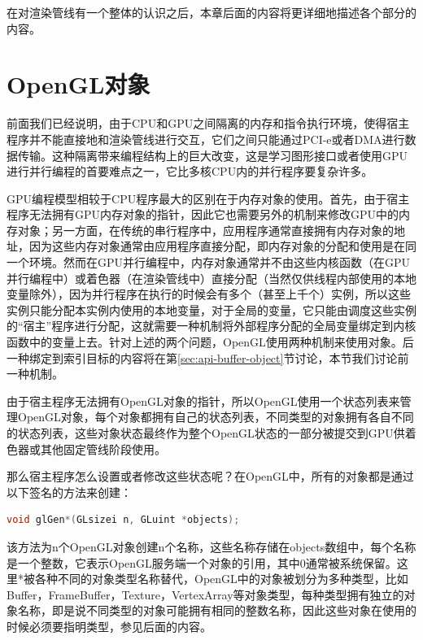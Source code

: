 在对渲染管线有一个整体的认识之后，本章后面的内容将更详细地描述各个部分的内容。





\section{OpenGL对象}\label{sec:api-opengl-object}
前面我们已经说明，由于CPU和GPU之间隔离的内存和指令执行环境，使得宿主程序并不能直接地和渲染管线进行交互，它们之间只能通过PCI-e或者DMA进行数据传输。这种隔离带来编程结构上的巨大改变，这是学习图形接口或者使用GPU进行并行编程的首要难点之一，它比多核CPU内的并行程序要复杂许多。

GPU编程模型相较于CPU程序最大的区别在于内存对象的使用。首先，由于宿主程序无法拥有GPU内存对象的指针，因此它也需要另外的机制来修改GPU中的内存对象；另一方面，在传统的串行程序中，应用程序通常直接拥有内存对象的地址，因为这些内存对象通常由应用程序直接分配，即内存对象的分配和使用是在同一个环境。然而在GPU并行编程中，内存对象通常并不由这些内核函数（在GPU并行编程中）或着色器（在渲染管线中）直接分配（当然仅供线程内部使用的本地变量除外），因为并行程序在执行的时候会有多个（甚至上千个）实例，所以这些实例只能分配本实例内使用的本地变量，对于全局的变量，它只能由调度这些实例的“宿主”程序进行分配，这就需要一种机制将外部程序分配的全局变量绑定到内核函数中的变量上去。针对上述的两个问题，OpenGL使用两种机制来使用对象。后一种绑定到索引目标的内容将在第\ref{sec:api-buffer-object}节讨论，本节我们讨论前一种机制。

由于宿主程序无法拥有OpenGL对象的指针，所以OpenGL使用一个状态列表来管理OpenGL对象，每个对象都拥有自己的状态列表，不同类型的对象拥有各自不同的状态列表，这些对象状态最终作为整个OpenGL状态的一部分被提交到GPU供着色器或其他固定管线阶段使用。

那么宿主程序怎么设置或者修改这些状态呢？在OpenGL中，所有的对象都是通过以下签名的方法来创建：

\begin{lstlisting}[language=C++]
void glGen*(GLsizei n​, GLuint *objects​);
\end{lstlisting}

该方法为n个OpenGL对象创建n个名称，这些名称存储在objects数组中，每个名称是一个整数，它表示OpenGL服务端一个对象的引用，其中0通常被系统保留。这里*被各种不同的对象类型名称替代，OpenGL中的对象被划分为多种类型，比如Buffer，FrameBuffer，Texture，VertexArray等对象类型，每种类型拥有独立的对象名称，即是说不同类型的对象可能拥有相同的整数名称，因此这些对象在使用的时候必须要指明类型，参见后面的内容。
	

